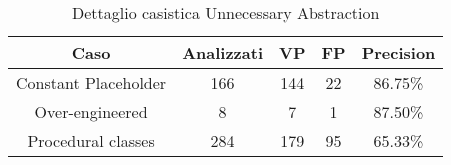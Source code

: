     \begin{table}[h]
        \centering
        \begin{tabular}{|c|c|c|c|c|}
            \hline
            \textbf{Caso} & \textbf{Analizzati} & \textbf{VP} & \textbf{FP} & \textbf{Precision} \\
            \hline
            Constant Placeholder & 166 & 144 & 22 & 86.75\%\\
            Over-engineered & 8 & 7 & 1 & 87.50\%\\
            Procedural classes & 284 & 179 & 95 & 65.33\% \\
            \hline
        \end{tabular}
        \caption{Dettaglio casistica Unnecessary Abstraction}
        \label{tab:caption} 
    \end{table}
    
